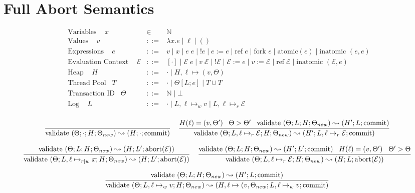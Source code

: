 \documentclass[9pt]{article}
\newcommand{\ctxt}[0]{\mathcal{E}}
\newcommand{\loc}[0]{\ell}
\newcommand{\atomic}[1]{\text{atomic}(#1)}
\newcommand{\alloc}[1]{\text{ref} \; #1}
\newcommand{\commit}[0]{\text{commit}}
\newcommand{\abort}[1]{\text{abort}(#1)}
\newcommand{\fork}[1]{\text{fork } #1}
\newcommand{\inatomic}[1]{\text{inatomic }(#1)}
\newcommand{\validate}[1]{\text{validate }(#1)}
\begin{document}
\section{Full Abort Semantics}
\begin{displaymath}
\begin{array}{rcll}
\text{Variables } \;\;\; x &\in& \mathbb{N} \\
\text{Values } \;\;\; v &::=& \lambda x. e \; | \; \loc \; | \; () \\
\text{Expressions } \;\;\; e &::=& v \; | \; x \; | \; e \; e \; | \; !e \; | \; e := e \; | \; \alloc{e} \; | \; \fork{e} \; | \; \atomic{e} \; | \; \inatomic{e, e}\\
\text{Evaluation Context } \;\;\; \ctxt &::=& [\cdot] \; | \; \ctxt \; e \; | \; v \; \ctxt \; | \; ! \ctxt \; | \; \ctxt := e \; | \; v := \ctxt \; | \; \alloc{\ctxt} \; | \; \inatomic{\ctxt, e}\\
\text{Heap } \;\;\; H &::=& \cdot \; | \; H, \loc \mapsto (v, \Theta) \\
\text{Thread Pool} \;\;\; T &::=& \cdot \; | \; \Theta[L; e] \; | \; T \cup T \\
\text{Transaction ID} \;\;\; \Theta &::=& \mathbb{N} \; | \; \bot \\
\text{Log } \;\;\; L &::=& \cdot \; | \; L, \loc \mapsto_w v \; | \; L, \loc \mapsto_r \ctxt \\
\end{array}
\end{displaymath}

\[
\infer[]{\validate{\Theta; \cdot; H; \Theta_{new}} \leadsto (H; \cdot; \commit)}{} \;\;\;
\infer[]{\validate{\Theta; L, \loc \mapsto_r \ctxt; H; \Theta_{new}} \leadsto (H'; L, \loc \mapsto_r \ctxt; \commit)}{H(\loc) = (v, \Theta') \;\;\; \Theta > \Theta' \;\;\; \validate{\Theta; L; H; \Theta_{new}} \leadsto (H'; L; \commit)}
\]

\[
\infer[]{\validate{\Theta; L, \loc \mapsto_{r|w} x; H; \Theta_{new}} \leadsto (H; L'; \abort{\ctxt})}{\validate{\Theta; L; H; \Theta_{new}} \leadsto (H; L'; \abort{\ctxt})} \;\;\;
\infer[]{\validate{\Theta; L, \loc \mapsto_r \ctxt; H; \Theta_{new}} \leadsto (H; L; \abort{\ctxt})}{\validate{\Theta; L; H; \Theta_{new}} \leadsto (H'; L'; \commit) \;\;\; H(\loc) = (v, \Theta') \;\;\; \Theta' > \Theta}
\]

\[
\infer[]{\validate{\Theta; L, \loc \mapsto_w v; H; \Theta_{new}} \leadsto (H, \loc \mapsto (v, \Theta_{new}; L, \loc \mapsto_w v; \commit)}{\validate{\Theta; L; H; \Theta_{new}} \leadsto (H'; L; \commit)}
\]
\end{document}
